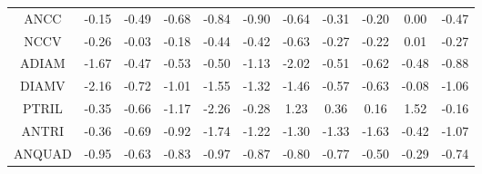 \begin{longtable}{ | c || c | c | c | c | c | c | c | c | c || c |}
ANCC &  \cellcolor[HTML]{FFFFFF} -0.15 &  \cellcolor[HTML]{FFEFEF} -0.49 &  \cellcolor[HTML]{FFEFEF} -0.68 &  \cellcolor[HTML]{FFE7E7} -0.84 &  \cellcolor[HTML]{FFE7E7} -0.90 &  \cellcolor[HTML]{FFEFEF} -0.64 &  \cellcolor[HTML]{FFF7F7} -0.31 &  \cellcolor[HTML]{FFF7F7} -0.20 &  \cellcolor[HTML]{FFFFFF} 0.00 &  \cellcolor[HTML]{FFF7F7} -0.47 \\
NCCV &  \cellcolor[HTML]{FFF7F7} -0.26 &  \cellcolor[HTML]{FFFFFF} -0.03 &  \cellcolor[HTML]{FFF7F7} -0.18 &  \cellcolor[HTML]{FFF7F7} -0.44 &  \cellcolor[HTML]{FFF7F7} -0.42 &  \cellcolor[HTML]{FFEFEF} -0.63 &  \cellcolor[HTML]{FFF7F7} -0.27 &  \cellcolor[HTML]{FFF7F7} -0.22 &  \cellcolor[HTML]{FFFFFF} 0.01 &  \cellcolor[HTML]{FFF7F7} -0.27 \\
ADIAM &  \cellcolor[HTML]{FFD7D7} -1.67 &  \cellcolor[HTML]{FFF7F7} -0.47 &  \cellcolor[HTML]{FFEFEF} -0.53 &  \cellcolor[HTML]{FFEFEF} -0.50 &  \cellcolor[HTML]{FFDFDF} -1.13 &  \cellcolor[HTML]{FFCFCF} -2.02 &  \cellcolor[HTML]{FFEFEF} -0.51 &  \cellcolor[HTML]{FFEFEF} -0.62 &  \cellcolor[HTML]{FFEFEF} -0.48 &  \cellcolor[HTML]{FFE7E7} -0.88 \\
DIAMV &  \cellcolor[HTML]{FFC7C7} -2.16 &  \cellcolor[HTML]{FFEFEF} -0.72 &  \cellcolor[HTML]{FFE7E7} -1.01 &  \cellcolor[HTML]{FFD7D7} -1.55 &  \cellcolor[HTML]{FFDFDF} -1.32 &  \cellcolor[HTML]{FFD7D7} -1.46 &  \cellcolor[HTML]{FFEFEF} -0.57 &  \cellcolor[HTML]{FFEFEF} -0.63 &  \cellcolor[HTML]{FFFFFF} -0.08 &  \cellcolor[HTML]{FFE7E7} -1.06 \\
PTRIL &  \cellcolor[HTML]{FFF7F7} -0.35 &  \cellcolor[HTML]{FFEFEF} -0.66 &  \cellcolor[HTML]{FFDFDF} -1.17 &  \cellcolor[HTML]{FFC7C7} -2.26 &  \cellcolor[HTML]{FFF7F7} -0.28 &  \cellcolor[HTML]{DFDFFF} 1.23 &  \cellcolor[HTML]{F7F7FF} 0.36 &  \cellcolor[HTML]{F7F7FF} 0.16 &  \cellcolor[HTML]{D7D7FF} 1.52 &  \cellcolor[HTML]{FFF7F7} -0.16 \\
ANTRI &  \cellcolor[HTML]{FFF7F7} -0.36 &  \cellcolor[HTML]{FFEFEF} -0.69 &  \cellcolor[HTML]{FFE7E7} -0.92 &  \cellcolor[HTML]{FFD7D7} -1.74 &  \cellcolor[HTML]{FFDFDF} -1.22 &  \cellcolor[HTML]{FFDFDF} -1.30 &  \cellcolor[HTML]{FFDFDF} -1.33 &  \cellcolor[HTML]{FFD7D7} -1.63 &  \cellcolor[HTML]{FFF7F7} -0.42 &  \cellcolor[HTML]{FFE7E7} -1.07 \\
ANQUAD &  \cellcolor[HTML]{FFE7E7} -0.95 &  \cellcolor[HTML]{FFEFEF} -0.63 &  \cellcolor[HTML]{FFE7E7} -0.83 &  \cellcolor[HTML]{FFE7E7} -0.97 &  \cellcolor[HTML]{FFE7E7} -0.87 &  \cellcolor[HTML]{FFE7E7} -0.80 &  \cellcolor[HTML]{FFEFEF} -0.77 &  \cellcolor[HTML]{FFEFEF} -0.50 &  \cellcolor[HTML]{FFF7F7} -0.29 &  \cellcolor[HTML]{FFEFEF} -0.74 \\

\end{longtable}

